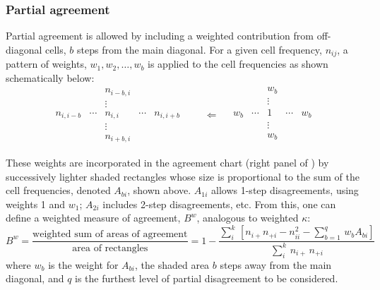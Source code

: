 \documentclass[10pt,krantz2]{krantz}\usepackage[]{graphicx}\usepackage[]{color}
\begin{document}
\subsubsection{Partial agreement}
 Partial agreement is allowed by
including a weighted contribution from off-diagonal cells, $b$
steps from the main diagonal.  For a given cell frequency,
$n_{ij}$, a pattern of weights, $w_1, w_2, \dots,  w_b$ is applied
to the cell frequencies
as shown schematically below:
\begin{equation*}
 \left.
 \begin{array}{ccccc}
   &  & n_{i-b,i} &  & \\
        &  & \vdots    &  & \\
        n_{i, i-b} & \cdots & n_{i, i} & \cdots & n_{i, i+b} \\
        &  & \vdots    &  & \\
   &  & n_{i+b,i} &  &
 \end{array}
  \right.
  \qquad \Leftarrow \quad
 \left.
 \begin{array}{ccccc}
   &  & w_b &  & \\
   &  & \vdots &  & \\
 w_b & \cdots & 1 & \cdots & w_b \\
   &  & \vdots &  & \\
   &  & w_b &  & \\
 \end{array}
  \right.
\end{equation*}

These weights are incorporated in the agreement chart
(right panel of ) by successively lighter
shaded rectangles whose size is proportional to the sum of the cell
frequencies, denoted \(A_{bi}\), shown above.  \(A_{1i}\)
allows 1-step disagreements, using weights 1 and $w_1$;
\(A_{2i}\) includes 2-step disagreements,
etc.  From this, one can define a weighted measure of agreement, $B^w$,
analogous to weighted \(\kappa\):
\begin{equation*}
  B^w  =
  \frac{ \mbox{weighted sum of areas of agreement}}
  { \mbox{area of rectangles} }  =
  1 - \frac{ \sum_i^k \,
  [ n_{i+} n_{+i} - n_{ii}^2  -
  \sum_{b=1}^q \,  w_b  A_{bi} ] }
  { \sum_i^k \,  n_{i+} \,  n_{+i} }
\end{equation*}
where \(w_b\) is the weight for \(A_{bi}\), the shaded area $b$ steps
away from the main diagonal, and $q$ is the furthest level of partial
disagreement to be considered.
\end{document}
